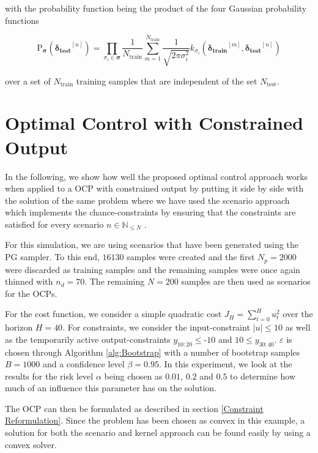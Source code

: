 with the probability function being the product of the four Gaussian probability functions 

 \begin{equation} \label{Gaussian Probability}
\text{P}_{\boldsymbol{\sigma}} ( \boldsymbol{\delta_\text{test}}^{[n]} ) = \prod_{\sigma_i \in \boldsymbol{\sigma}} \frac{1}{N_\text{train}} \sum_{m = 1}^{N_\text{train}} \frac{1}{\sqrt{2 \pi \sigma_i^2}} k_{\sigma_i}(\boldsymbol{\delta_\text{train}}^{[m]} ,\boldsymbol{\delta_\text{test}}^{[n]})
\end{equation}

over a set of $N_\text{train}$ training samples that are independent of the set $N_\text{test}$.


\section{Optimal Control with Constrained Output} \label{optimal control}

In the following, we show how well the proposed optimal control approach works when applied to a OCP with constrained output by putting it side by side with the solution of the same problem where we have used the scenario approach which implements the chance-constraints by ensuring that the constraints are satisfied for every scenario $n \in \mathbb{N}_{\leq N}$ \cite{Garatti_22}. 

For this simulation, we are using scenarios that have been generated using the PG sampler. To this end, $16130$ samples were created and the first $N_p = 2000$ were discarded as training samples and the remaining samples were once again thinned with $n_d = 70$. The remaining $N = 200$ samples are then used as scenarios for the OCPs.

For the cost function, we consider a simple quadratic cost $J_H = \sum_{t = 0}^H u_t^2$ over the horizon $H = 40$. For constraints, we consider the input-constraint $\left| u \right| \leq 10$ as well as the temporarily active output-constraints $y_{10:20} \leq \text{-} 10$ and $10 \leq y_{30:40}$. $\varepsilon$ is chosen through Algorithm \ref{alg:Bootstrap} with a number of bootstrap samples $B = 1000$ and a confidence level $\beta = 0.95$. In this experiment, we look at the results for the risk level $\alpha$ being chosen as $0.01$, $0.2$ and $0.5$ to determine how much of an influence this parameter has on the solution.

The OCP can then be formulated as described in section \ref{Constraint Reformulation}. Since the problem has been chosen as convex in this example, a solution for both the scenario and kernel approach can be found easily by using a convex solver.

